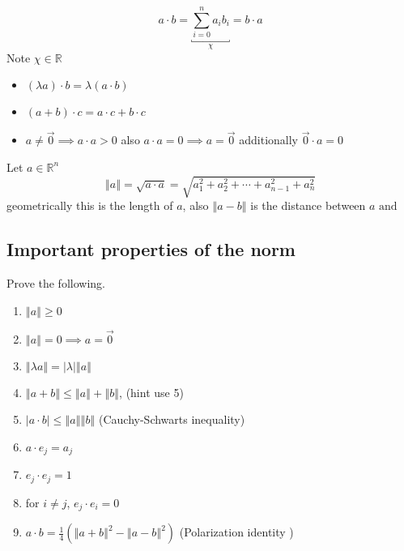 \documentclass[11pt]{book}
\begin{document}
\begin{defn}\label{defn:dot_product}
    \[
    a \cdot b = \underbracket{\sum_{i=0}^{n} a_{i} b_{i}}_{\chi}  = b \cdot a 
    \]
    Note $\chi \in \mathbb{R} $ 
\end{defn}

\begin{itemize}
    \item $\left( \lambda a \right)  \cdot b= \lambda \left( a  \cdot b \right) $ 
    \item $\left( a + b \right)  \cdot c= a \cdot c + b \cdot c$ 
    \item $a\neq \vec{0} \implies a \cdot a > 0$ also $a \cdot a = 0 \implies a = \vec{0} $ additionally $\vec{0}  \cdot a = 0$ 
\end{itemize}

\begin{defn}[Norm]\label{defn:norm}
    Let $a \in \mathbb{R}^{n}  $ 
    \[
    \left\Vert a \right\Vert = \sqrt{a \cdot a} = \sqrt{a_{1}^2   +  a_{2}^2   +  \dotsb   +  a_{n - 1}^2   +  a_{n}^2  } 
    \]
    geometrically this is the length of $a$, also $\left\Vert a - b \right\Vert $ is the distance between $a \text{ and } $ 
\end{defn}



\subsection{Important properties of the norm}%
\label{sub:important_properties_of_the_norm}

Prove the following.
\begin{enumerate}
    \item $\left\Vert a \right\Vert \ge 0$ 
    \item $\left\Vert a \right\Vert = 0 \implies a = \vec{0} $ 
    \item $\left\Vert \lambda a \right\Vert = \left| \lambda  \right| \left\Vert a \right\Vert  $ 
    \item $\left\Vert a + b \right\Vert \le \left\Vert a \right\Vert  + \left\Vert b \right\Vert $, (hint use 5)
    \item $\left| a \cdot b \right| \le \left\Vert a \right\Vert \left\Vert b \right\Vert $ (Cauchy-Schwarts inequality)
    \item $a \cdot e_{j} = a_{j} $ 
    \item $e_{j}  \cdot e_{j} = 1$ 
    \item for $i\neq j$,  $e_{j}  \cdot e_{i} = 0$ 
    \item $a \cdot b = \frac{1}{4}\left( \left\Vert a + b \right\Vert ^2  - \left\Vert a - b \right\Vert ^2  \right) $ (Polarization identity )
\end{enumerate}



\end{document}
